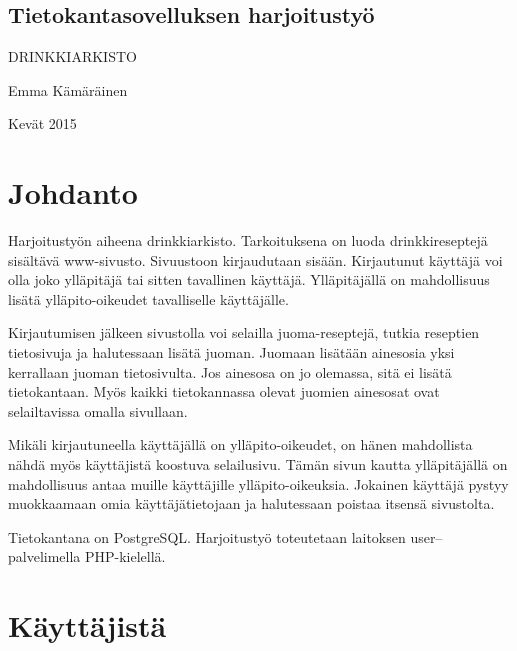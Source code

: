 \documentclass[a4paper]{article}
\begin{document}
\begin{titlepage}
\begin{center}
\section*{Tietokantasovelluksen harjoitustyö}
\begin{LARGE}
{DRINKKIARKISTO}
\end{LARGE}
\linebreak
\linebreak
\begin{large}
Emma Kämäräinen
\end{large}
\linebreak
\linebreak
Kevät 2015

\end{center}


\end{titlepage}



\tableofcontents

\section{Johdanto}

Harjoitustyön aiheena drinkkiarkisto. Tarkoituksena on luoda drinkkireseptejä sisältävä www-sivusto. Sivuustoon kirjaudutaan sisään. Kirjautunut käyttäjä voi olla joko ylläpitäjä tai sitten tavallinen käyttäjä. Ylläpitäjällä on mahdollisuus lisätä ylläpito-oikeudet tavalliselle käyttäjälle.   

Kirjautumisen jälkeen sivustolla voi selailla juoma-reseptejä, tutkia reseptien tietosivuja ja halutessaan lisätä juoman. Juomaan lisätään ainesosia yksi kerrallaan juoman tietosivulta. Jos ainesosa on jo olemassa, sitä ei lisätä tietokantaan. Myös kaikki tietokannassa olevat juomien ainesosat ovat selailtavissa omalla sivullaan. 

Mikäli kirjautuneella käyttäjällä on ylläpito-oikeudet, on hänen mahdollista nähdä myös käyttäjistä koostuva selailusivu. Tämän sivun  kautta ylläpitäjällä on mahdollisuus antaa muille käyttäjille ylläpito-oikeuksia. Jokainen käyttäjä pystyy muokkaamaan omia käyttäjätietojaan ja halutessaan poistaa itsensä sivustolta. 

Tietokantana on PostgreSQL. Harjoitustyö toteutetaan laitoksen user--palvelimella PHP-kielellä. 

\newpage
\section{Käyttäjistä}
\end{document}
